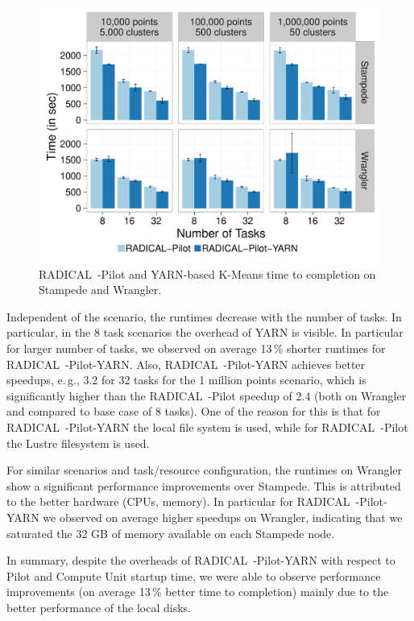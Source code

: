 \begin{figure}[t]
    \centering
    \includegraphics[width=.85\textwidth]{figures/data_analytics_hpc/hpc_hadoop/kmeans.pdf}
    \caption{RADICAL~-Pilot and YARN-based K-Means time to completion on Stampede and Wrangler.}
    \label{fig:experiments_kmeans_rpyarnkmeans}
\end{figure}

Independent of the scenario, the runtimes decrease with the number of tasks.
In particular, in the 8 task scenarios the overhead of YARN is visible.
In particular for larger number of tasks, we observed on average 13\,\% shorter runtimes for RADICAL~-Pilot-YARN.
Also, RADICAL~-Pilot-YARN achieves better speedups, e.\,g., 3.2 for 32 tasks for the 1 million points scenario, which is significantly higher than the RADICAL~-Pilot speedup of 2.4 (both on Wrangler and compared to base case of 8 tasks).
One of the reason for this is that for RADICAL~-Pilot-YARN the local file system is used, while for RADICAL~-Pilot the Lustre filesystem is used.

For similar scenarios and task/resource configuration, the runtimes on Wrangler show a significant performance improvements over Stampede.
This is attributed to the better hardware (CPUs, memory).
In particular for RADICAL~-Pilot-YARN we observed on average higher speedups on Wrangler, indicating that we saturated the 32 GB of memory available on each Stampede node.

In summary, despite the overheads of RADICAL~-Pilot-YARN with respect to Pilot and Compute Unit startup time, we were able to observe performance improvements (on average 13\,\% better time to completion) mainly due to the better performance of the local disks.


